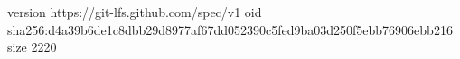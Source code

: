 version https://git-lfs.github.com/spec/v1
oid sha256:d4a39b6de1c8dbb29d8977af67dd052390c5fed9ba03d250f5ebb76906ebb216
size 2220
